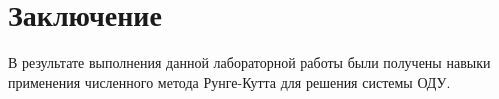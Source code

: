 \chapter{Заключение}

В результате выполнения данной лабораторной работы были получены навыки применения численного метода Рунге-Кутта для решения системы ОДУ.
